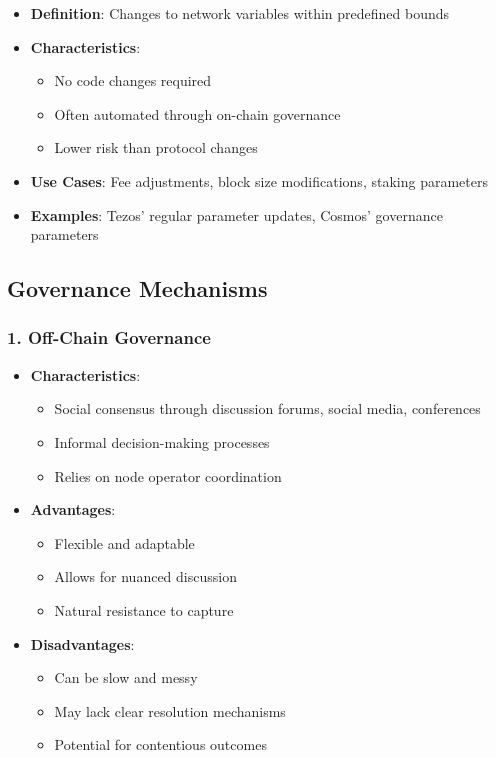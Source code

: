 \documentclass[
  letterpaper,
  DIV=11,
  numbers=noendperiod]{scrreprt}
\providecommand{\tightlist}{%
  \setlength{\itemsep}{0pt}\setlength{\parskip}{0pt}}\usepackage{longtable,booktabs,array}
\begin{document}
\begin{itemize}
\tightlist
\item
  \textbf{Definition}: Changes to network variables within predefined
  bounds
\item
  \textbf{Characteristics}:

  \begin{itemize}
  \tightlist
  \item
    No code changes required
  \item
    Often automated through on-chain governance
  \item
    Lower risk than protocol changes
  \end{itemize}
\item
  \textbf{Use Cases}: Fee adjustments, block size modifications, staking
  parameters
\item
  \textbf{Examples}: Tezos' regular parameter updates, Cosmos'
  governance parameters
\end{itemize}

\subsection{Governance Mechanisms}\label{governance-mechanisms}

\subsubsection{1. Off-Chain Governance}\label{off-chain-governance}

\begin{itemize}
\tightlist
\item
  \textbf{Characteristics}:

  \begin{itemize}
  \tightlist
  \item
    Social consensus through discussion forums, social media,
    conferences
  \item
    Informal decision-making processes
  \item
    Relies on node operator coordination
  \end{itemize}
\item
  \textbf{Advantages}:

  \begin{itemize}
  \tightlist
  \item
    Flexible and adaptable
  \item
    Allows for nuanced discussion
  \item
    Natural resistance to capture
  \end{itemize}
\item
  \textbf{Disadvantages}:

  \begin{itemize}
  \tightlist
  \item
    Can be slow and messy
  \item
    May lack clear resolution mechanisms
  \item
    Potential for contentious outcomes
  \end{itemize}
\end{itemize}
\end{document}
